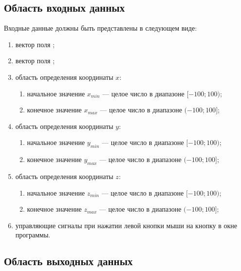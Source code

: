 \documentclass[14pt,a4paper,final]{extreport}
\begin{document}
\subsection{Область входных данных}
Входные данные должны быть представлены в следующем виде:
\begin{enumerate}
\item вектор поля \fieldA ;
\item вектор поля \fieldB ;
\item область определения координаты \( x \):
	\begin{enumerate}[label=\asbuk*)]
	\item начальное значение \( x_{min} \) --- целое число в диапазоне \( [-100; 100) \);
	\item конечное значение \( x_{max} \) --- целое число в диапазоне \( (-100; 100] \);
	\end{enumerate}	
\item область определения координаты \( y \):
	\begin{enumerate}[label=\asbuk*)]
	\item начальное значение \( y_{min} \) --- целое число в диапазоне \( [-100; 100) \);
	\item конечное значение \( y_{max} \) --- целое число в диапазоне \( (-100; 100] \);
	\end{enumerate}
\item область определения координаты \( z \):
	\begin{enumerate}[label=\asbuk*)]
	\item начальное значение \( z_{min} \) --- целое число в диапазоне \( [-100; 100) \);
	\item конечное значение \( z_{max} \) --- целое число в диапазоне \( (-100; 100] \);
	\end{enumerate}
\item управляющие сигналы при нажатии левой кнопки мыши на кнопку в окне программы.
\end{enumerate}	

\subsection{Область выходных данных}
\end{document}
